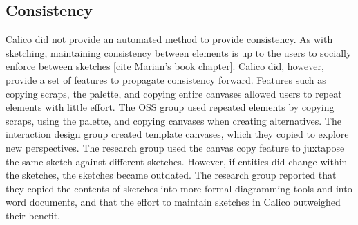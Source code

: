 %

\subsection{Consistency}
Calico did not provide an automated method to provide consistency. As with sketching, maintaining consistency between elements is up to the users to socially enforce between sketches [cite Marian's book chapter]. Calico did, however, provide a set of features to propagate consistency forward. Features such as copying scraps, the palette, and copying entire canvases allowed users to repeat elements with little effort. The OSS group used repeated elements by copying scraps, using the palette, and copying canvases when creating alternatives. The interaction design group created template canvases, which they copied to explore new perspectives. The research group used the canvas copy feature to juxtapose the same sketch against different sketches. However, if entities did change within the sketches, the sketches became outdated. The research group reported that they copied the contents of sketches into more formal diagramming tools and into word documents, and that the effort to maintain sketches in Calico outweighed their benefit.


